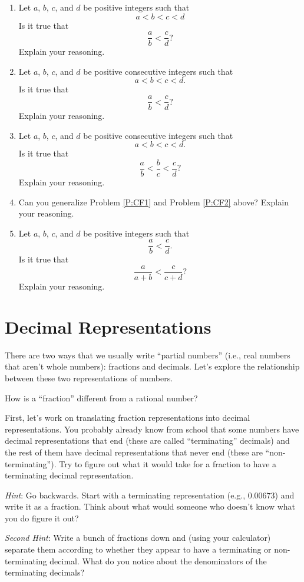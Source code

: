 \begin{problems}
\begin{enumerate}
\item Let $a$, $b$, $c$, and $d$ be positive integers such that 
\[
a<b<c<d
\]
Is it true that 
\[
\frac{a}{b}<\frac{c}{d}?
\]
Explain your reasoning.
\item\label{P:CF1} Let $a$, $b$, $c$, and $d$ be positive consecutive
  integers such that
\[
a<b<c<d.
\]
Is it true that 
\[
\frac{a}{b}<\frac{c}{d}?
\]
Explain your reasoning.
\item\label{P:CF2} Let $a$, $b$, $c$, and $d$ be positive consecutive
  integers such that
\[
a<b<c<d.
\]
Is it true that 
\[
\frac{a}{b}<\frac{b}{c}<\frac{c}{d}?
\]
Explain your reasoning.
\item Can you generalize Problem \ref{P:CF1} and Problem \ref{P:CF2}
  above? Explain your reasoning.
\item Let $a$, $b$, $c$, and $d$ be positive integers such that 
\[
\frac{a}{b}<\frac{c}{d}.
\]
Is it true that 
\[
\frac{a}{a+b}<\frac{c}{c+d}?
\]
Explain your reasoning.
\end{enumerate}
\end{problems}

\section{Decimal Representations}

There are two ways that we usually write ``partial numbers'' (i.e., real numbers that aren't whole numbers):  fractions and decimals.  Let's explore the relationship between these two representations of numbers.  

\begin{question} How is a ``fraction'' different from a rational number?  
\end{question}
\QM

First, let's work on translating fraction representations into decimal representations.  You probably already know from school that some numbers have decimal representations that end (these are called ``terminating'' decimals) and the rest of them have decimal representations that never end (these are ``non-terminating'').  Try to figure out what it would take for a fraction to have a terminating decimal representation.  

\emph{Hint}:  Go backwards.  Start with a terminating representation (e.g., $0.00673$) and write it as a fraction.  Think about what would someone who doesn't know what you do figure it out?

\emph{Second Hint}:  Write a bunch of fractions down and (using your calculator) separate them according to whether they appear to have a terminating or non-terminating decimal.  What do you notice about the denominators of the terminating decimals?

